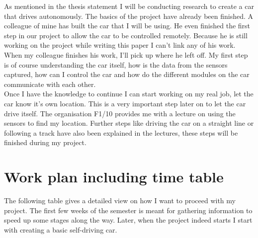 \documentclass[a4paper,notitlepage]{article}
\begin{document}
As mentioned in the thesis statement I will be conducting research to create a car that drives autonomously. The basics of the project have already been finished. A colleague of mine has built the car that I will be using. He even finished the first step in our project to allow the car to be controlled remotely. Because he is still working on the project while writing this paper I can't link any of his work.\\

When my colleague finishes his work, I'll pick up where he left off. My first step is of course understanding the car itself, how is the data from the sensors captured, how can I control the car and how do the different modules on the car communicate with each other. \\
\newpage
Once I have the knowledge to continue I can start working on my real job, let the car know it's own location. This is a very important step later on to let the car drive itself. The organisation F1/10 provides me with a lecture on using the sensors to find my location\cite{F1local}. Further steps like driving the car on a straight line or following a track have also been explained in the lectures, these steps will be finished during my project.

\section*{Work plan including time table}

The following table gives a detailed view on how I want to proceed with my project. The first few weeks of the semester is meant for gathering information to speed up some stages along the way. Later, when the project indeed starts I start with creating a basic self-driving car.
\end{document}
